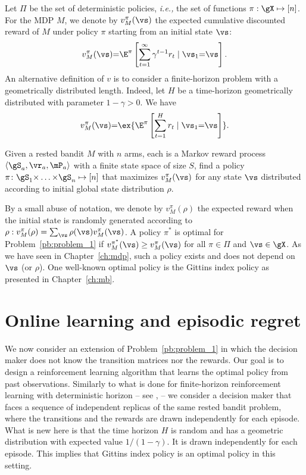 Let $\Pi$ be the set of deterministic policies, \emph{i.e.,} the set of
functions $\pi:\gX\mapsto[n]$. For the MDP $M$, we denote by
$v_{M}^{\pi}(\vs)$ the expected cumulative discounted reward of ${M}$ under policy $\pi$ starting from an initial state $\vs$:
\[v_{M}^\pi(\vs) {=}
\E^\pi\left[\sum_{t=1}^{\infty} \gamma^{t-1}r_t \mid \vs_1{=}\vs\right].\]
An alternative definition of $v$ is to consider a finite-horizon problem with a geometrically distributed length. Indeed, let $H$ be a time-horizon geometrically distributed with parameter $1-\gamma>0$. We have
\begin{equation}
    \label{eq:V-vs_R}
    v_{M}^\pi(\vs)  {=} \ex{\E^\pi\left[\sum_{t=1}^{H} r_t \mid \vs_1{=}\vs\right]}.
\end{equation}
\begin{prob}
\label{pb:problem_1}
Given a rested bandit $M$ with $n$ arms, each is a Markov reward process $\langle\gS_a,\vr_a,\mP_a\rangle$ with a finite state space of size $S$, find a policy $\pi\colon\gS_1{\times}\dots{\times}\gS_n\mapsto[n]$ that maximizes $v_{M}^\pi(\vs)$ for any state $\vs$ distributed according to initial global state distribution $\rho$.
\end{prob}

By a small abuse of notation, we denote by $v_M^\pi(\rho)$ the expected reward when the initial state is randomly generated according to $\rho: v_M^\pi(\rho)=\sum_{\vs}\rho(\vs)v_{M}^\pi(\vs)$.
A policy
$\pi^*$ is optimal for Problem~\ref{pb:problem_1} if $ v_{M}^{\pi^*}(\vs) \ge v_{M}^\pi(\vs) $ for all
$\pi\in\Pi$ and $\vs\in\gX$.
As we have seen in Chapter~\ref{ch:mdp},
such a policy exists and does not depend on $\vs$ (or $\rho$). One well-known optimal policy is the Gittins index policy as presented in Chapter~\ref{ch:mb}. 


\section{Online learning and episodic regret}
\label{ch:rested:sec:problem}

We now consider an extension of Problem~\ref{pb:problem_1} in which the decision maker does not know the transition matrices
nor the rewards. Our goal is to design a reinforcement learning algorithm that
learns the optimal policy from past observations.  Similarly to what is done
for finite-horizon reinforcement learning with deterministic horizon -- see
\eg, \cite{zanette2019tighter,jin2018q,azar2017minimax,osband2013more} --
we consider a decision maker that faces a sequence of independent replicas of
the same rested bandit problem, where the transitions and the rewards 
are drawn independently for each episode.
What is new here is that the time horizon $H$ is random and has a geometric distribution with expected value $1/(1-\gamma)$. It is drawn  independently for each episode. This implies that Gittins index policy is an optimal policy in this setting. %

